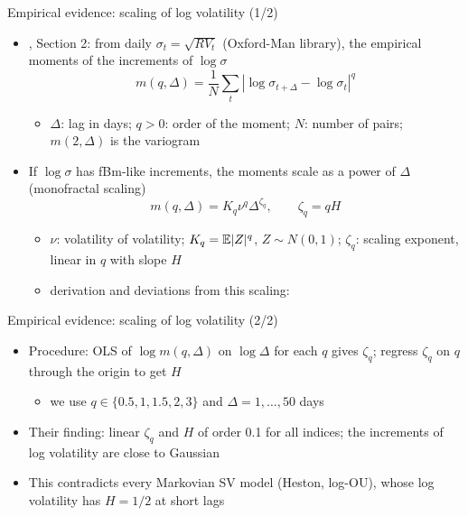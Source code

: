 \begin{frame}{Empirical evidence: scaling of log volatility (1/2)}
\itemsize{\small}
\begin{itemize}
    \item {}, Section 2: from daily $\sigma_t = \sqrt{RV_t}$ (Oxford-Man library), the empirical moments of the increments of $\log\sigma$
    \[ m(q, \Delta) = \frac1N\sum_t|\log\sigma_{t+\Delta} - \log\sigma_t|^q \]
    \begin{itemize}
        \item $\Delta$: lag in days; $q > 0$: order of the moment; $N$: number of pairs; $m(2, \Delta)$ is the variogram
    \end{itemize}
    \item If $\log\sigma$ has fBm-like increments, the moments scale as a power of $\Delta$ (monofractal scaling)
    \[ m(q, \Delta) = K_q\nu^q\Delta^{\zeta_q}, \qquad \zeta_q = qH \]
    \begin{itemize}
        \item $\nu$: volatility of volatility; $K_q = \mathbb{E}|Z|^q$, $Z \sim N(0, 1)$; $\zeta_q$: scaling exponent, linear in $q$ with slope $H$
        \item derivation and deviations from this scaling:   %
    \end{itemize}
\end{itemize}
\end{frame}

\begin{frame}{Empirical evidence: scaling of log volatility (2/2)}
\itemsize{\small}
\begin{itemize}
    \item Procedure: OLS of $\log m(q, \Delta)$ on $\log\Delta$ for each $q$ gives $\zeta_q$; regress $\zeta_q$ on $q$ through the origin to get $H$
    \begin{itemize}
        \item we use $q \in \{0.5, 1, 1.5, 2, 3\}$ and $\Delta = 1, \dots, 50$ days
    \end{itemize}
    \item Their finding: linear $\zeta_q$ and $H$ of order 0.1 for all indices; the increments of log volatility are close to Gaussian
    \item This contradicts every Markovian SV model (Heston, log-OU), whose log volatility has $H = 1/2$ at short lags
\end{itemize}
\end{frame}

